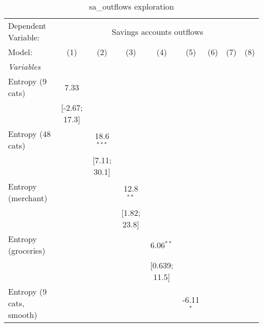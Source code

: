 
\begin{table}[htbp]
   \centering
   \tiny
   \begin{threeparttable}[b]
      \caption{\label{tab:reg_sa_outflows_explore} sa\_outflows exploration}
      \begin{tabular}{lcccccccc}
         \tabularnewline \midrule \midrule
         Dependent Variable: & \multicolumn{8}{c}{Savings accounts outflows}\\
         Model:                      & (1)             & (2)             & (3)             & (4)             & (5)             & (6)             & (7)             & (8)\\  
         \midrule
         \emph{Variables}\\
         Entropy (9 cats)            & 7.33            &                 &                 &                 &                 &                 &                 &   \\   
                                     & [-2.67; 17.3]   &                 &                 &                 &                 &                 &                 &   \\   
         Entropy (48 cats)           &                 & 18.6$^{***}$    &                 &                 &                 &                 &                 &   \\   
                                     &                 & [7.11; 30.1]    &                 &                 &                 &                 &                 &   \\   
         Entropy (merchant)          &                 &                 & 12.8$^{**}$     &                 &                 &                 &                 &   \\   
                                     &                 &                 & [1.82; 23.8]    &                 &                 &                 &                 &   \\   
         Entropy (groceries)         &                 &                 &                 & 6.06$^{**}$     &                 &                 &                 &   \\   
                                     &                 &                 &                 & [0.639; 11.5]   &                 &                 &                 &   \\   
         Entropy (9 cats, smooth)    &                 &                 &                 &                 & -6.11$^{*}$     &                 &                 &   \\   

\end{tabular}
\end{threeparttable}
\end{table}
